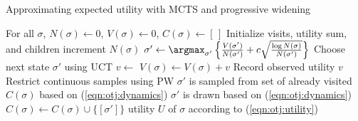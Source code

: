 \begin{algorithm}
\caption{Approximating expected utility with MCTS and progressive widening}
\label{alg:otj:mcvts}
  \begin{algorithmic}[1]
    \State For all $\sigma$, $N(\sigma) \gets 0$, $V(\sigma) \gets 0$, $C(\sigma) \gets [\,]$
	\Comment Initialize visits, utility sum, and children
    \State increment $N(\sigma)$
    \State $\sigma' \gets \argmax_{\sigma'} \left\{\frac{V(\sigma')}{N(\sigma')} + c \sqrt{\frac{\log N(\sigma)}{N(\sigma')}} \right\}$
      \Comment Choose next state $\sigma'$ using UCT
	  \State $v \gets $
      \State $V(\sigma) \gets V(\sigma) + v$
	  \Comment Record observed utility
      \State \Return $v$
	  \Comment Restrict continuous samples using PW
        \State $\sigma'$ is sampled from set of already visited $C(\sigma)$ based on (\ref{eqn:otj:dynamics})
	  \Else
        \State $\sigma'$ is drawn based on (\ref{eqn:otj:dynamics})
        \State $C(\sigma) \gets C(\sigma) \cup \{ [\sigma'] \}$
	  \EndIf
      \State \Return {}
    \State \Return utility $U$ of $\sigma$ according to (\ref{eqn:otj:utility})
    \EndIf
    \EndFunction{}
  \end{algorithmic}
\end{algorithm}

